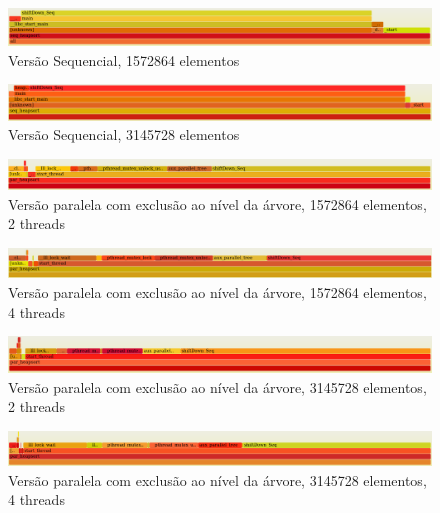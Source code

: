 \documentclass{article}
\begin{document}
\begin{figure}[H]
    \centering
    \includegraphics[width=18cm]{Pictures/seq_1572864.png}
    \caption{Versão Sequencial, 1572864 elementos}
\end{figure}

\begin{figure}[H]
    \centering
    \includegraphics[width=18cm]{Pictures/seq_3145728.png}
    \caption{Versão Sequencial, 3145728 elementos}
\end{figure}

\begin{figure}[H]
    \centering
    \includegraphics[width=18cm]{Pictures/par_1572864_2_tree.png}
    \caption{Versão paralela com exclusão ao nível da árvore, 1572864 elementos, 2 threads}
\end{figure}

\begin{figure}[H]
    \centering
    \includegraphics[width=18cm]{Pictures/par_1572864_4_tree.png}
    \caption{Versão paralela com exclusão ao nível da árvore, 1572864 elementos, 4 threads}
\end{figure}

\begin{figure}[H]
    \centering
    \includegraphics[width=18cm]{Pictures/par_3145728_2_tree.png}
    \caption{Versão paralela com exclusão ao nível da árvore, 3145728 elementos, 2 threads}
\end{figure}

\begin{figure}[H]
    \centering
    \includegraphics[width=18cm]{Pictures/par_3145728_4_tree.png}
    \caption{Versão paralela com exclusão ao nível da árvore, 3145728 elementos, 4 threads}
\end{figure}
\end{document}
